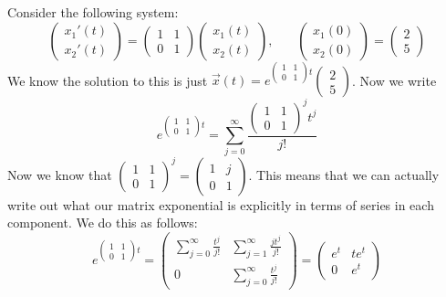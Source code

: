 \documentclass{article}
\theoremstyle{definition}
\begin{document}
        \begin{mdframed}[]
            Consider the following system:
            \[
                \begin{pmatrix}
                    x_1'(t)\\
                    x_2'(t)
                \end{pmatrix} = \begin{pmatrix}
                    1 & 1 \\ 0 & 1
                \end{pmatrix} \begin{pmatrix}
                    x_1(t) \\ x_2(t)
                \end{pmatrix}, \ \ \ \ \ \ \ \ \begin{pmatrix}
                    x_1(0) \\ x_2(0)
                \end{pmatrix} = \begin{pmatrix}
                    2 \\ 5
                \end{pmatrix}
            \]
            We know the solution to this is just $\vec x(t) = e^{\begin{pmatrix}1 & 1 \\0 & 1\end{pmatrix}t}\begin{pmatrix}
                2\\ 5
            \end{pmatrix}$. Now we write
            \[
                e^{\begin{pmatrix}1 & 1 \\0 & 1\end{pmatrix}t} = \sum_{j=0}^\infty \frac{\begin{pmatrix}1 & 1 \\0 & 1\end{pmatrix}^jt^j}{j!}
            \]
            Now we know that $\begin{pmatrix}1 & 1 \\0 & 1\end{pmatrix}^j = \begin{pmatrix}1 & j\\0 & 1\end{pmatrix}$.
            This means that we can actually write out what our matrix exponential is explicitly in terms of series in each component.
            We do this as follows:
            \[
                e^{\begin{pmatrix}1 & 1 \\0 & 1\end{pmatrix}t} =\begin{pmatrix}
                    \sum_{j=0}^\infty \frac{t^j}{j!} & \sum_{j=1}^\infty \frac{j t^j}{j!}\\
                    0 & \sum_{j=0}^\infty \frac{t^j}{j!} 
                \end{pmatrix} = \begin{pmatrix}
                    e^t & te^t \\
                    0 & e^t
                \end{pmatrix}
            \]
        \end{mdframed}
\end{document}
